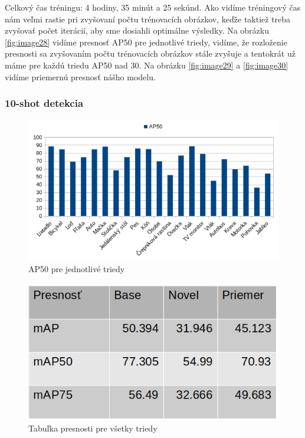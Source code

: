 Celkový čas tréningu: 4 hodiny, 35 minút a 25 sekúnd. Ako vidíme tréningový čas nám veľmi rastie pri zvyšovaní počtu trénovacích obrázkov, keďže taktiež treba zvyšovať počet iterácií, aby sme dosiahli optimálne výsledky. Na obrázku \ref{fig:image28} vidíme presnosť AP50 pre jednotlivé triedy, vidíme, že rozloženie presnosti sa zvyšovaním počtu trénovacích obrázkov stále zvyšuje a tentokrát už máme pre každú triedu AP50 nad 30. Na obrázku \ref{fig:image29} a \ref{fig:image30} vidíme priemernú presnosť nášho modelu.

\subsubsection{10-shot detekcia}

\begin{figure}[H]
\includegraphics[width=\textwidth]{images/10_shot_classes_AP50.png}
\centering
\caption{AP50 pre jednotlivé triedy}
\label{fig:image31}
\end{figure}

\begin{figure}[H]
\includegraphics[width=\textwidth]{images/10shot_table_meanAP.png}
\centering
\caption{Tabuľka presnosti pre všetky triedy}
\label{fig:image32}
\end{figure}

